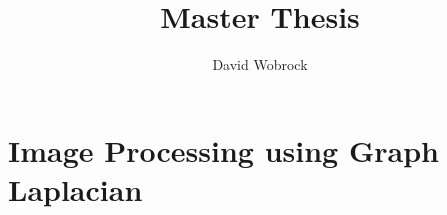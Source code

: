 \documentclass[]{article}
\title{Master Thesis}
\author{David Wobrock}
\begin{document}
\maketitle

\section{Image Processing using Graph Laplacian}
\end{document}

